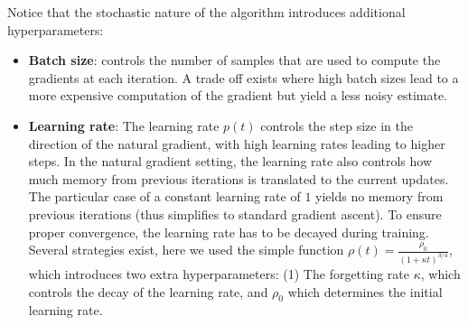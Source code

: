 
Notice that the stochastic nature of the algorithm introduces additional hyperparameters:

\begin{itemize}
    \item \textbf{Batch size}: controls the number of samples that are used to compute the gradients at each iteration. A trade off exists where high batch sizes lead to a more expensive computation of the gradient but yield a less noisy estimate.

    \item \textbf{Learning rate}: The learning rate $p(t)$ controls the step size in the direction of the natural gradient, with high learning rates leading to higher steps. In the natural gradient setting, the learning rate also controls how much memory from previous iterations is translated to the current updates. The particular case of a constant learning rate of $1$ yields no memory from previous iterations (thus simplifies to standard gradient ascent). To ensure proper convergence, the learning rate has to be decayed during training. Several strategies exist\cite{Ranganath2013}, here we used the simple function $\rho(t) = \frac{\rho_0}{(1 + \kappa t)^{3/4}}$, which introduces two extra hyperparameters: (1) The forgetting rate $\kappa$, which controls the decay of the learning rate, and $\rho_0$ which determines the initial learning rate.

\end{itemize}